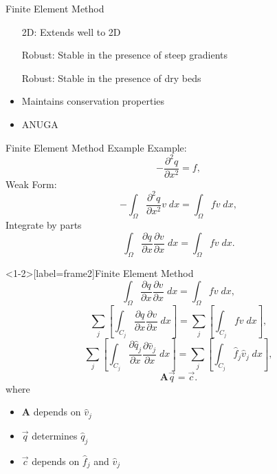 \documentclass[]{beamer}
\begin{document}
\begin{frame}{Finite Element Method}
	\begin{itemize}
		\item[2D:] Extends well to 2D
		\item[Robust:] Stable in the presence of steep gradients 
		\item[Robust:] Stable in the presence of dry beds
		\item Maintains conservation properties
		\item ANUGA
	\end{itemize}
\end{frame}

\begin{frame}{Finite Element Method Example}
	Example:
		\[  -\frac{\partial^2 {q}}{\partial x^2}= f,\]
		\pause
	Weak Form:
	\[
	 -\int_{\Omega }\frac{\partial^2 {q}}{\partial x^2} v \; dx = \int_{\Omega } f v \; dx,
	\]
	\pause
	Integrate by parts %
	\[
  \int_{\Omega }\frac{\partial {q}}{\partial x} \frac{\partial {v}}{\partial x} \; dx  = \int_{\Omega } f v \; dx.
	\]
\end{frame}

\begin{frame}<1-2>[label=frame2]{Finite Element Method}
	\[
	 \int_{\Omega }\frac{\partial {q}}{\partial x} \frac{\partial {v}}{\partial x} \; dx  = \int_{\Omega } f v \; dx,
	\]
	\pause
	\[
	 \sum_j  \left[\int_{C_j} \frac{\partial {q}}{\partial x} \frac{\partial {v}}{\partial x} \; dx \right] = \sum_j \left[ \int_{C_j} f v  \; dx \right],
	\]
	\pause
		\[
		\sum_j  \left[\int_{C_j} \frac{\partial {\hat{q}_j }}{\partial x} \frac{\partial {\hat{v}_j }}{\partial x} \; dx\right]  = \sum_j \left[ \int_{C_j} \hat{f}_j \hat{v}_j  \; dx \right],
		\]
	\pause
		\begin{equation*}
		\boldsymbol{A} \vec{q} = \vec{c}.
		\end{equation*}
	\pause
		where 
		\begin{itemize}
			\item $\boldsymbol{A}$ depends on $\hat{v}_j$
			\item $\vec{q}$ determines $\hat{q}_j$
			\item $\vec{c}$ depends on $\hat{f}_j$ and $\hat{v}_j$
		\end{itemize}
\end{frame}
\end{document}

